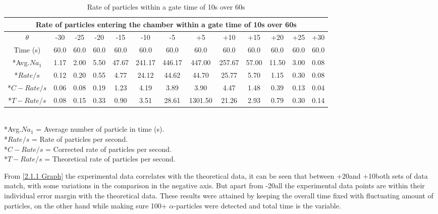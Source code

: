 \documentclass[12pt]{article}
\begin{document}
\begin{table}[H]
\begin{center}
 \footnotesize
 \begin{tabular}{|c||c|c|c|c|c|c||c|c|c|c|c|c|}
 \hline
 \multicolumn{13}{|c|}{Rate of particles entering the chamber within a gate time of 10s over 60s} \\
 \hline \hline
 $\theta$ & -30 & -25 & -20 & -15 & -10 & -5 & +5 & +10 & +15 & +20 & +25 & +30 \\
 \hline
 \hline
 Time (s) & 60.0 & 60.0 & 60.0 & 60.0 & 60.0 & 60.0 & 60.0 & 60.0 & 60.0 & 60.0 & 60.0 & 60.0 \\
 \hline
 *Avg.$Na_1$ & 1.17 & 2.00 & 5.50 & 47.67 & 241.17 & 446.17 & 447.00 & 257.67 & 57.00 & 11.50 & 3.00 & 0.08 \\
 \hline
 *$Rate/s$ & 0.12 & 0.20 & 0.55 & 4.77 & 24.12 & 44.62 & 44.70 & 25.77 & 5.70 & 1.15 & 0.30 & 0.08 \\
 \hline \hline
 *$C-Rate/s$ & 0.06 & 0.08 & 0.19 & 1.23 & 4.19 & 3.89 & 3.90 & 4.47 & 1.48 & 0.39 & 0.13 & 0.04 \\
 \hline
 *$T-Rate/s$ & 0.08 & 0.15 & 0.33 & 0.90 & 3.51 & 28.61 & 1301.50 & 21.26 & 2.93 & 0.79 & 0.30 & 0.14 \\
 \hline
 \end{tabular} \\ [0.2cm]
 *Avg.$Na_1$ = Average number of particle in time (s). \\
 *$Rate/s$ = Rate of particles per second. \\
 *$C-Rate/s$ = Corrected rate of particles per second. \\
 *$T-Rate/s$ = Theoretical rate of particles per second.
 \caption{Rate of particles within a gate time of 10s over 60s}
 \label{Rate of particles within a gate time of 10s over 60s table}
\end{center}
\end{table}

From \cref{2.1.1 Graph} the experimental data correlates with the theoretical data, it can be seen that between +20\textdegree and +10\textdegree both sets of data match, with some variations in the comparison in the negative axis. But apart from -20\textdegree all the experimental data points are within their individual error margin with the theoretical data. These results were attained by keeping the overall time fixed with fluctuating amount of particles, on the other hand while making sure 100+ $\alpha$-particles were detected and total time is the variable.  \\
\end{document}
